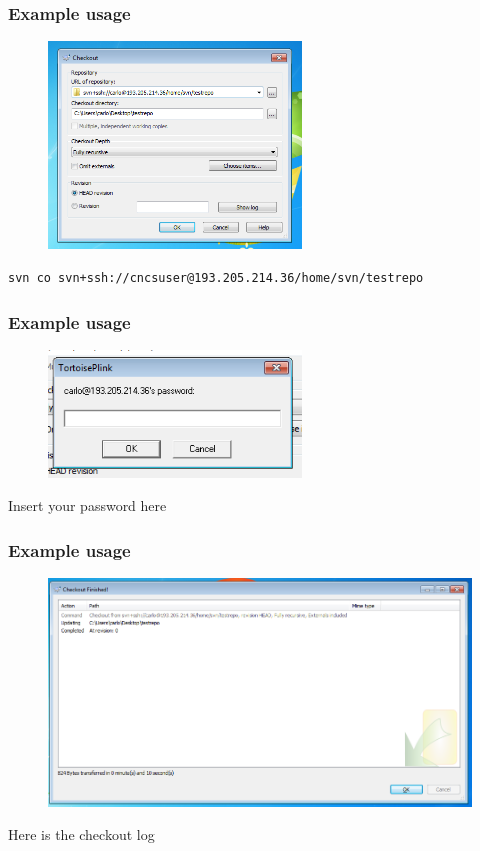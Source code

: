 \documentclass[10pt]{beamer}
\begin{document}
\begin{frame}[fragile]
\frametitle{Example usage}
\begin{figure}[h]
 \centering
 \includegraphics[width=0.6\textwidth]{images/image2.png}
\end{figure}
\begin{verbatim}
svn co svn+ssh://cncsuser@193.205.214.36/home/svn/testrepo 
\end{verbatim}
\end{frame}

\begin{frame}[fragile]
\frametitle{Example usage}
\begin{figure}[h]
 \centering
 \includegraphics[width=0.6\textwidth]{images/image3.png}
\end{figure}
Insert your password here
\end{frame}

\begin{frame}[fragile]
\frametitle{Example usage}
\begin{figure}[h]
 \centering
 \includegraphics[width=1.0\textwidth]{images/image4.png}
\end{figure}
Here is the checkout log
\end{frame}
\end{document}
